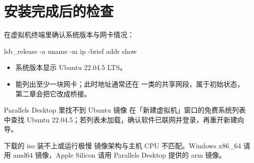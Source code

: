\section{安装完成后的检查}
\label{sec:post-install}
在虚拟机终端里确认系统版本与网卡情况：

\begin{command}
lsb_release -a
uname -m
ip -brief addr show
\end{command}

\begin{expected}
\begin{itemize}
\item 系统版本显示 Ubuntu 22.04.5 LTS。
\item 能列出至少一块网卡；此时地址通常还在  一类的共享网段，属于初始状态，第二章会把它改成桥接。
\end{itemize}
\end{expected}

\begin{faq}{Parallels Desktop 里找不到 Ubuntu 镜像}
在「新建虚拟机」窗口的免费系统列表中查找 Ubuntu 22.04.5；若列表未加载，确认软件已联网并登录，再重开新建向导。
\end{faq}
\begin{faq}{下载的 iso 装不上或运行极慢}
镜像架构与主机 CPU 不匹配。Windows x86\_64 请用 amd64 镜像，Apple Silicon 请用 Parallels Desktop 提供的 arm 镜像。
\end{faq}
